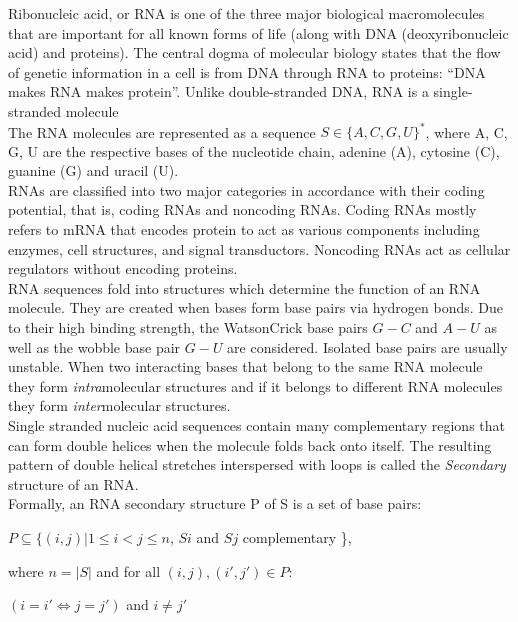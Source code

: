\documentclass[twoside,a4paper]{report}
\begin{document}
	Ribonucleic acid, or RNA is one of the three major biological macromolecules that are important for all known forms of life (along with DNA (deoxyribonucleic acid) and proteins). The central dogma of molecular biology states that the flow of genetic information in a cell is from DNA through RNA to proteins: “DNA makes RNA makes protein”. Unlike double-stranded DNA, RNA is a single-stranded molecule\\
	The RNA molecules are represented as a sequence $S \in \{A, C, G, U\} ^*$, where A, C, G, U are the respective bases of the nucleotide chain, adenine (A), cytosine (C), guanine (G) and uracil (U).\\
	RNAs are classified into two major categories in accordance with their coding potential, that is, coding RNAs and noncoding RNAs. Coding RNAs mostly refers to mRNA that encodes protein to act as various components including enzymes, cell structures, and signal transductors. Noncoding RNAs act as cellular regulators without encoding proteins.\\
	RNA sequences fold into structures which determine the function of an RNA molecule. They are created when bases form base pairs via hydrogen bonds. Due to their high binding strength, the WatsonCrick base pairs $G - C$ and $A - U$ as well as the wobble base pair $G - U$ are considered. Isolated base pairs are usually unstable. When two interacting bases that belong to the same RNA molecule they form \textit{intra}molecular structures and if it belongs to different RNA molecules they form \textit{inter}molecular structures.\\
	Single stranded nucleic acid sequences contain many complementary regions that can form double helices when the molecule folds back onto itself. The resulting pattern of double helical stretches interspersed with loops is called the \textit{Secondary} structure of an RNA.\\
	Formally, an RNA secondary structure P of S is a set of base pairs:\\
	\begin{center}
	 $ P \subseteq \{(i, j) | 1 \leq i < j \leq n $, $ Si $ and $Sj$ complementary \},\\
	\end{center}
	where $ n = |S| $ and for all $(i, j) , ( i', j' ) \in  P:$\\
	\begin{center}
	$(i = i' \Leftrightarrow j = j')$ and $ i \neq j'$ \\
	\end{center}
\end{document}
